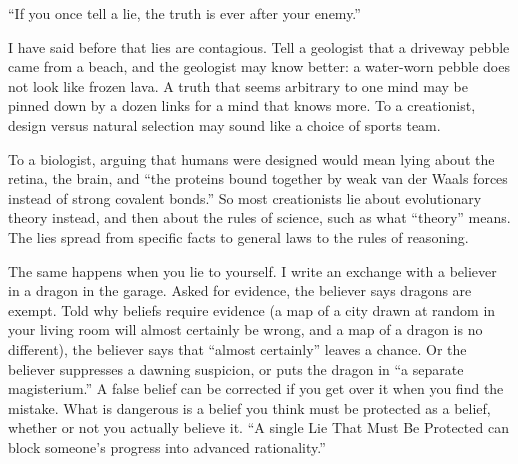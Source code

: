 
``If you once tell a lie, the truth is ever after your enemy.''

I have said before that lies are contagious. Tell a geologist that a driveway pebble came from a beach, and the geologist may know better: a water-worn pebble does not look like frozen lava. A truth that seems arbitrary to one mind may be pinned down by a dozen links for a mind that knows more. To a creationist, design versus natural selection may sound like a choice of sports team. 

To a biologist, arguing that humans were designed would mean lying about the retina, the brain, and ``the proteins bound together by weak van der Waals forces instead of strong covalent bonds.''  So most creationists lie about evolutionary theory instead, and then about the rules of science, such as what ``theory'' means. The lies spread from specific facts to general laws to the rules of reasoning. 

The same happens when you lie to yourself. I write an exchange with a believer in a dragon in the garage. Asked for evidence, the believer says dragons are exempt. Told why beliefs require evidence (a map of a city drawn at random in your living room will almost certainly be wrong, and a map of a dragon is no different), the believer says that ``almost certainly'' leaves a chance. Or the believer suppresses a dawning suspicion, or puts the dragon in ``a separate magisterium.'' A false belief can be corrected if you get over it when you find the mistake. What is dangerous is a belief you think must be protected as a belief, whether or not you actually believe it. ``A single Lie That Must Be Protected can block someone's progress into advanced rationality.'' 

